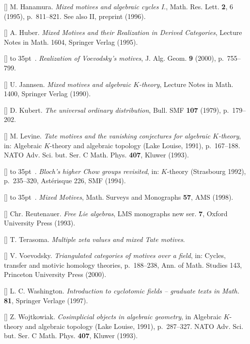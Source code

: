 {{\medskip
\ref{}
M. Hanamura.
{\it Mixed motives and algebraic cycles I.},
Math. Res. Lett. {\bf 2}, 6 (1995),
p.~811--821.
See also II, preprint (1996).

\medskip
\ref{}
A. Huber.
{\it Mixed Motives and their Realization in
Derived Categories}, Lecture Notes in Math.
1604, Springer Verlag (1995).

\medskip
\ref{}
\hbox to 35pt{\hrulefill}~.
{\it Realization of Voevodsky's motives}, J.
Alg. Geom. {\bf 9} (2000), p.~755--799.

\medskip
\ref{}
U. Jannsen.
{\it Mixed motives and algebraic $K$-theory},
Lecture Notes in Math. 1400, Springer Verlag
(1990).

\medskip
\ref{}
D. Kubert.
{\it The universal ordinary distribution},
Bull. SMF {\bf 107} (1979), p.~179--202.

\medskip
\ref{}
M. Levine.
{\it Tate motives and the vanishing
conjectures for algebraic $K$-theory}, in:
Algebraic $K$-theory and algebraic topology
(Lake Louise, 1991), p.~167--188.
NATO Adv. Sci. but. Ser. C Math. Phys. {\bf
407}, Kluwer (1993).

\medskip
\ref{}
\hbox to 35pt{\hrulefill}~.
{\it Bloch's higher Chow groups revisited}, in:
$K$-theory (Strasbourg 1992), p.~235--320,
Ast\'erisque 226, SMF (1994).

\medskip
\ref{}
\hbox to 35pt{\hrulefill}~.
{\it Mixed Motives}, Math. Surveys and
Monographs {\bf 57}, AMS (1998).

\medskip
\ref{}
Chr. Reutenauer.
{\it Free Lie algebras}, LMS monographs new ser.
{\bf 7},
Oxford University Press (1993).

\medskip
\ref{}
T. Terasoma.
{\it Multiple zeta values and mixed Tate
motives}.

\medskip
\ref{}
V. Voevodsky.
{\it Triangulated categories of motives over a
field}, in: Cycles, transfer and motivic
homology theories, p.~188--238,
Ann. of Math. Studies 143, Princeton University
Press (2000).

\medskip
\ref{}
L. C. Washington.
{\it Introduction to cyclotomic fields --
graduate texts in Math.} {\bf 81}, Springer
Verlage (1997).


\medskip
\ref{}
Z. Wojtkowiak.
{\it Cosimplicial objects in algebraic
geometry}, in Algebraic $K$-theory and
algebraic topology (Lake Louise, 1991), p.~287--327.
NATO Adv. Sci. but. Ser. C Math. Phys. {\bf
407}, Kluwer (1993).

}}

